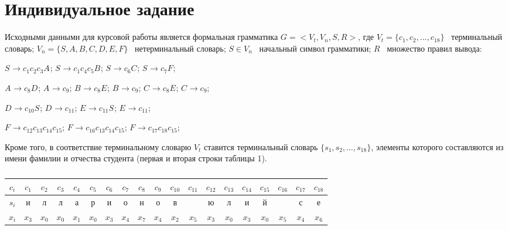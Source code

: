\documentclass[a4paper,14pt,russian]{extarticle} %
\begin{document}
\section {Индивидуальное задание}
Исходными данными для курсовой работы является формальная грамматика \(G = <V_t, V_n, S, R>\), где \(V_t = \{ c_1, c_2, ... ,c_18 \} \) \textendash\ терминальный словарь; \(V_n = \{ S, A, B, C, D, E, F \} \) \textendash\ нетерминальный словарь; \(S \in V_n\) \textendash\ начальный символ грамматики; \(R\) \textendash\ множество правил вывода: 
\begin{center}
	\({S_{}}\rightarrow{{c_{1}}{c_{2}}{c_{3}} {A_{}}}\);
	\({S_{}}\rightarrow{{c_{1}}{c_{4}}{c_{5}} {B_{}}}\);
	\({S_{}}\rightarrow{{c_{6}} {C_{}}}\);
	\({S_{}}\rightarrow{{c_{7}} {F_{}}}\);
	
	\({A_{}}\rightarrow{{c_{8}} {D_{}}}\);
	\({A_{}}\rightarrow{{c_{9}}}\);
	\({B_{}}\rightarrow{{c_{8}} {E_{}}}\);
	\({B_{}}\rightarrow{{c_{9}}}\);
	\({C_{}}\rightarrow{{c_{8}} {E_{}}}\);
	\({C_{}}\rightarrow{{c_{9}}}\);
	
	\({D_{}}\rightarrow{{c_{10}} {S_{}}}\);
	\({D_{}}\rightarrow{{c_{11}}}\);
	\({E_{}}\rightarrow{{c_{11}} {S_{}}}\);
	\({E_{}}\rightarrow{{c_{11}}}\);
	
	\({F_{}}\rightarrow{{c_{12}}{c_{13}}{c_{14}}{c_{15}}}\);
	\({F_{}}\rightarrow{{c_{16}}{c_{13}}{c_{14}}{c_{15}}}\);
	\({F_{}}\rightarrow{{c_{17}}{c_{18}}{c_{15}}}\);
\end{center} 
Кроме того, в соответствие терминальному словарю \(V_t\) ставится терминальный словарь \(\{ s_1, s_2, ... ,s_18 \} \), элементы которого составляются из имени фамилии и отчества студента (первая и вторая строки таблицы 1).

\begin{table}[H]	
	\centering	
	\centering	
	\begin{threeparttable}
	\renewcommand{\arraystretch}{0.85}
	\renewcommand{\tabcolsep}{0.3em}	 
	\caption{}	
	\label{tab:student_name}
		\begin{tabular}{| c || c |c |c |c |c |c |c |c |c |c |c |c |c |c |c |c |c |c |}
			\hline
			\(c_i\) & \({c_{1}}\)  & \({c_{2}}\)  & \({c_{3}}\)  & \({c_{4}}\)  & \({c_{5}}\)  & \({c_{6}}\)  & \({c_{7}}\)  & \({c_{8}}\)  & \({c_{9}}\)  & \({c_{10}}\)  & \({c_{11}}\)  & \({c_{12}}\)  & \({c_{13}}\)  & \({c_{14}}\)  & \({c_{15}}\)  & \({c_{16}}\)  & \({c_{17}}\)  & \({c_{18}}\)  \\ \hline
			\(s_i\) & и  & л  & л  & а  & р  & и  & о  & н  & о  & в  &    & ю  & л  & и  & й  &    & с  & е  \\ \hline
			\(x_i\) & \({x_{3}}\)  & \({x_{0}}\)  & \({x_{0}}\)  & \({x_{1}}\)  & \({x_{0}}\)  & \({x_{3}}\)  & \({x_{4}}\)  & \({x_{7}}\)  & \({x_{4}}\)  & \({x_{2}}\)  & \({x_{5}}\)  & \({x_{3}}\)  & \({x_{0}}\)  & \({x_{3}}\)  & \({x_{0}}\)  & \({x_{5}}\)  & \({x_{4}}\)  & \({x_{6}}\)  \\ \hline
		\end{tabular}			
	\end{threeparttable}
\end{table}	
\end{document}
